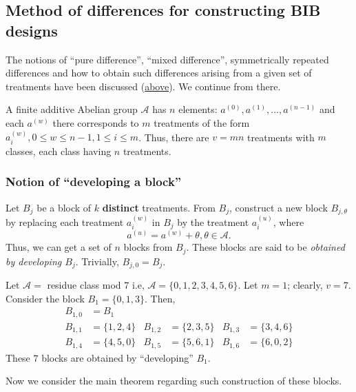 \documentclass[12pt]{article}
\theoremstyle{definition}
\newenvironment{note}{
\begin{tcolorbox}[colback=blue!5!white,colframe=blue!75!black,title=Note, parbox = false] }{\end{tcolorbox} }
\newenvironment{example}[1][\unskip]{
\begin{tcolorbox}[colback=blue!5!white,colframe=blue!75!black, title = {Example #1}, parbox = false] }{\end{tcolorbox} }
\begin{document}
\subsection{Method of differences for constructing BIB designs}

The notions of ``pure difference'', ``mixed difference'', symmetrically repeated differences and how to obtain such differences arising from a given set of treatments have been discussed (\hyperref[intro]{above}). We continue from there.\par

\begin{note}
	A finite additive Abelian group $\mathcal{A}$ has $n$ elements: $a^{(0)}, a^{(1)}, \ldots, a^{(n-1)}$ and each $a^{(w)}$ there corresponds to $m$ treatments of the form $a^{(w)}_{i}, 0 \leq w \leq n-1, 1 \leq i \leq m$. Thus, there are $v = mn$ treatments with $m$ classes, each class having $n$ treatments.
\end{note}

\subsubsection{Notion of ``developing a block''}

Let $B_j$ be a block of $k$ \textbf{distinct} treatments. From $B_j$, construct a new block $B_{j, \theta}$ by replacing each treatment $a^{(w)}_{i}$ in $B_j$ by the treatment $a_i^{(u)}$, where $$ a^{(u)} = a^{(w)} + \theta, \theta \in \mathcal{A}. $$ 
Thus, we can get a set of $n$ blocks from $B_j$. These blocks are said to be \textit{obtained by developing $B_j$}. Trivially, $B_{j, 0} = B_j$.

\begin{example}
	Let $\mathcal{A} =$ residue class mod $7$ i.e, $\mathcal{A} = \{0,1,2,3,4,5,6\}$. Let $m = 1$; clearly, $v = 7$. Consider the block $B_1 = \{0, 1, 3\}$. Then, 
\begin{align*}
	B_{1,0} &= B_1 \\  
	B_{1,1} &= \{1,2,4\}  &B_{1,2} &= \{2,3,5\} &B_{1,3} &= \{3,4,6\} \\
	B_{1,4} &= \{4,5,0\} &B_{1,5} &= \{5,6,1\} &B_{1,6} &= \{6,0,2\}
\end{align*}
These $7$ blocks are obtained by ``developing'' $B_1$. 
\end{example}

Now we consider the main theorem regarding such construction of these blocks.
\end{document}

